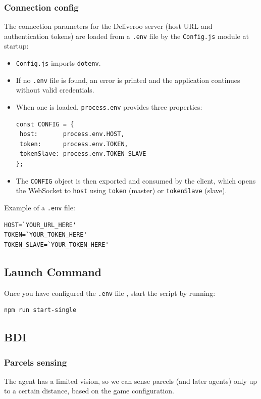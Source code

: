 \subsubsection*{Connection config}
The connection parameters for the Deliveroo server (host URL and authentication tokens) are loaded from a \texttt{.env} file by the \texttt{Config.js} module at startup:

\begin{itemize}[nosep]
  \item \texttt{Config.js} imports \texttt{dotenv}.
  \item If no \texttt{.env} file is found, an error is printed and the application continues without valid credentials.
  \item When one is loaded, \texttt{process.env} provides three properties:
    \begin{verbatim}
const CONFIG = {
 host:       process.env.HOST,
 token:      process.env.TOKEN,
 tokenSlave: process.env.TOKEN_SLAVE
};
    \end{verbatim}
  \item The \texttt{CONFIG} object is then exported and consumed by the client, which opens the WebSocket to \texttt{host} using \texttt{token} (master) or \texttt{tokenSlave} (slave).
\end{itemize}

\noindent Example of a \texttt{.env} file:
\begin{verbatim}
HOST=`YOUR_URL_HERE'
TOKEN=`YOUR_TOKEN_HERE'
TOKEN_SLAVE=`YOUR_TOKEN_HERE'
\end{verbatim}

\subsection*{Launch Command}
Once you have configured the \texttt{.env} file , start the script by running:
\begin{verbatim}
npm run start-single
\end{verbatim}



\subsection{BDI}
\subsubsection*{Parcels sensing}
The agent has a limited vision, so we can sense parcels (and later agents) only up to a certain distance, based on the game configuration.

